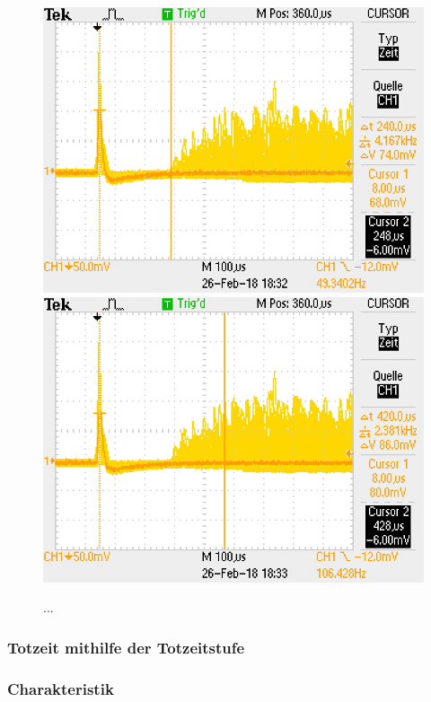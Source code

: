 \documentclass[12pt,a4paper]{article}
\begin{document}
\begin{figure}
\centering
\includegraphics[scale=0.49]{Bilder/Stever/Stever2_1.PNG}
\includegraphics[scale=0.49]{Bilder/Stever/Stever2_2.PNG}
\caption{...}
\label{fig:Stever2}
\end{figure}

\subsubsection{Totzeit mithilfe der Totzeitstufe}

\subsubsection{Charakteristik}
\end{document}

